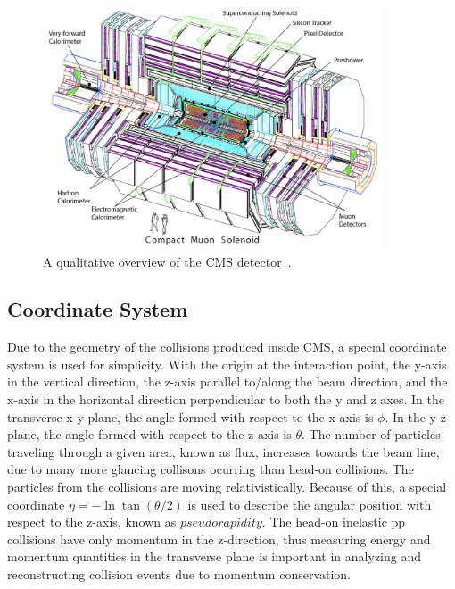 \begin{figure}[hbtp]
 \begin{center}
   \includegraphics[width=0.9\textwidth]{ch3_figs/cms_overview_white.pdf}
   \caption[Overview of the CMS detector]{A qualitative overview of the CMS detector~\cite{cms_bluebook}.\label{fig:cms_overview}}
 \end{center}
\end{figure}

\subsection{Coordinate System}
Due to the geometry of the collisions produced inside CMS, a special coordinate system is used for simplicity. With the origin at the interaction point,
the y-axis in the vertical direction, the z-axis parallel to/along the beam direction, and the x-axis in the horizontal direction perpendicular to both the y
and z axes. In the transverse x-y plane, the angle formed with respect to the x-axis is $\phi$. In the y-z plane, the angle formed with respect to the z-axis
is $\theta$. The number of particles traveling through a given area, known as flux, increases towards the beam line, due to many more glancing collisons ocurring
than head-on collisions. The particles from the collisions are moving relativistically. Because of this, a special coordinate $\eta = -\ln\tan(\theta/2)$ 
is used to describe the angular position with respect to the z-axis, known as $pseudorapidity$. The head-on inelastic pp collisions have only momentum in the 
z-direction, thus measuring energy and momentum quantities in the transverse plane is important in analyzing and reconstructing collision events due to momentum
conservation.  

